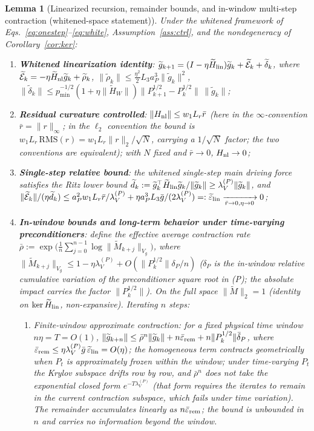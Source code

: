 \documentclass[11pt]{article}
\newcommand{\W}{W}
\newcommand{\Erem}{\mathcal E}
\newcommand{\wt}[1]{\widetilde{#1}}
\newtheorem{lemma}{Lemma}[section]
\numberwithin{equation}{section}
\begin{document}
\begin{lemma}[Linearized recursion, remainder bounds, and in-window multi-step contraction (whitened-space statement)]\label{lem:linrec}
Under the whitened framework of Eqs.~\eqref{eq:onestep}--\eqref{eq:white}, Assumption~\ref{ass:ctrl}, and the nondegeneracy of Corollary~\ref{cor:ker}:
\begin{enumerate}[label=(\roman*),leftmargin=2.4em,itemsep=3pt]
\item \textbf{Whitened linearization identity}: $\wt g_{k+1}=(I-\eta\wt H_{\rm lin})\wt g_k+\wt\Erem_k+\wt\delta_k$, where $\wt\Erem_k=-\eta\wt H_{\rm nl}\wt g_k+\wt\rho_k$, $\|\wt\rho_k\|\le\tfrac{\eta^2}{2}L_3a_P^3\|\wt g_k\|^2$, $\|\wt\delta_k\|\le p_{\min}^{-1/2}(1+\eta\|\wt H_{\W}\|)\|P_{k+1}^{1/2}-P_k^{1/2}\|\,\|\wt g_k\|$;
\item \textbf{Residual curvature controlled}: $\|H_{\rm nl}\|\le w_1L_r\bar r$ (here in the $\infty$-convention $\bar r=\|r\|_\infty$; in the $\ell_2$ convention the bound is $w_1L_r\,\mathrm{RMS}(r)=w_1L_r\|r\|_2/\sqrt N$, carrying a $1/\sqrt N$ factor; the two conventions are equivalent); with $N$ fixed and $\bar r\to0$, $H_{\rm nl}\to0$;
\item \textbf{Single-step relative bound}: the whitened single-step main driving force satisfies the Ritz lower bound $\wt d_k:=\wt g_k^\top\wt H_{\rm lin}\wt g_k/\|\wt g_k\|\ge\lambda_V^{(P)}\|\wt g_k\|$, and $\|\wt\Erem_k\|/(\eta\wt d_k)\le a_P^2w_1L_r\bar r/\lambda_V^{(P)}+\eta a_P^3L_3\bar g/(2\lambda_V^{(P)})=:\wt\varepsilon_{\rm lin}\xrightarrow[\bar r\to0,\eta\to0]{}0$;
\item \textbf{In-window bounds and long-term behavior under time-varying preconditioners}: define the effective average contraction rate $\bar\rho:=\exp\!\bigl(\tfrac1n\sum_{j=0}^{n-1}\log\|\wt M_{k+j}\|_{V_g}\bigr)$, where $\|\wt M_{k+j}\|_{V_g}\le 1-\eta\lambda_V^{(P)}+O(\|P_k^{1/2}\|\delta_P/n)$ ($\delta_P$ is the in-window \emph{relative} cumulative variation of the preconditioner square root in (P); the absolute impact carries the factor $\|P_k^{1/2}\|$). On the \emph{full space} $\|\wt M\|_2=1$ (identity on $\ker\wt H_{\rm lin}$, non-expansive). Iterating $n$ steps:
  \begin{enumerate}[label=(\alph*),leftmargin=2em,itemsep=1pt]
  \item \emph{Finite-window approximate contraction}: for a fixed physical time window $n\eta=T=O(1)$, $\|\wt g_{k+n}\|\le\bar\rho^n\|\wt g_k\|+n\bar\varepsilon_{\rm rem}+n\|P_k^{1/2}\|\bar\delta_P$, where $\bar\varepsilon_{\rm rem}\le\eta\lambda_V^{(P)}\bar g\,\wt\varepsilon_{\rm lin}=O(\eta)$; the homogeneous term contracts geometrically when $P_t$ is approximately frozen within the window; under time-varying $P_t$ the Krylov subspace drifts row by row, and $\bar\rho^n$ does not take the exponential closed form $e^{-T\lambda_V^{(P)}}$ (that form requires the iterates to remain in the current contraction subspace, which fails under time variation). The remainder accumulates linearly as $n\bar\varepsilon_{\rm rem}$; the bound is unbounded in $n$ and carries no information beyond the window.

\end{enumerate}
\end{enumerate}
\end{lemma}
\end{document}

